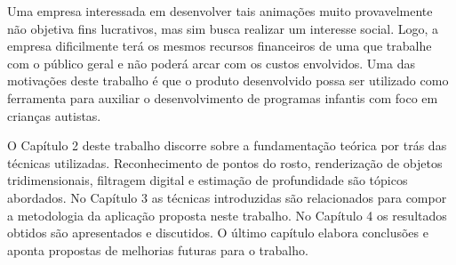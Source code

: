 Uma empresa interessada em desenvolver tais animações muito provavelmente não objetiva fins lucrativos, mas sim busca realizar um interesse social. Logo, a empresa dificilmente terá os mesmos recursos financeiros de uma que trabalhe com o público geral e não poderá arcar com os custos envolvidos.  Uma das motivações deste trabalho é que o produto desenvolvido possa ser utilizado como ferramenta para auxiliar o desenvolvimento de programas infantis com foco em crianças autistas.

O Capítulo 2 deste trabalho discorre sobre a fundamentação teórica 
por trás das técnicas utilizadas. Reconhecimento de pontos do rosto,
renderização de objetos tridimensionais, filtragem digital e estimação de
profundidade são tópicos abordados. No Capítulo 3 as técnicas introduzidas são relacionados para compor a metodologia da aplicação proposta neste trabalho.
No Capítulo 4 os resultados obtidos são apresentados e discutidos.
O último capítulo elabora conclusões e aponta propostas de melhorias futuras para o
trabalho.
